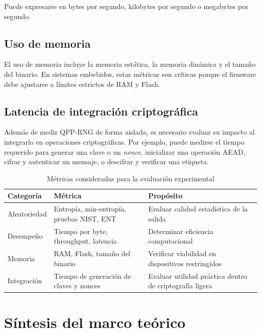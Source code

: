 Puede expresarse en bytes por segundo, kilobytes por segundo o megabytes por segundo.

\subsection{Uso de memoria}

El uso de memoria incluye la memoria estática, la memoria dinámica y el tamaño del binario. En sistemas embebidos, estas métricas son críticas porque el firmware debe ajustarse a límites estrictos de RAM y Flash.


\subsection{Latencia de integración criptográfica}

Además de medir QPP-RNG de forma aislada, es necesario evaluar su impacto al integrarlo en operaciones criptográficas. Por ejemplo, puede medirse el tiempo requerido para generar una clave o un \textit{nonce}, inicializar una operación AEAD, cifrar y autenticar un mensaje, o descifrar y verificar una etiqueta.


\begin{table}[H]
\centering
\caption{Métricas consideradas para la evaluación experimental}
\label{tab:metricas_evaluacion}
\begin{tabularx}{\textwidth}{@{}p{}p{}X@{}}
\toprule
\textbf{Categoría} & \textbf{Métrica} & \textbf{Propósito} \\
\midrule
Aleatoriedad & Entropía, min-entropía, pruebas NIST, ENT & Evaluar calidad estadística de la salida \\
Desempeño & Tiempo por byte, throughput, latencia & Determinar eficiencia computacional \\
Memoria & RAM, Flash, tamaño del binario & Verificar viabilidad en dispositivos restringidos \\
Integración & Tiempo de generación de claves y nonces & Evaluar utilidad práctica dentro de criptografía ligera \\
\bottomrule
\end{tabularx}
\end{table}

\section{Síntesis del marco teórico}

